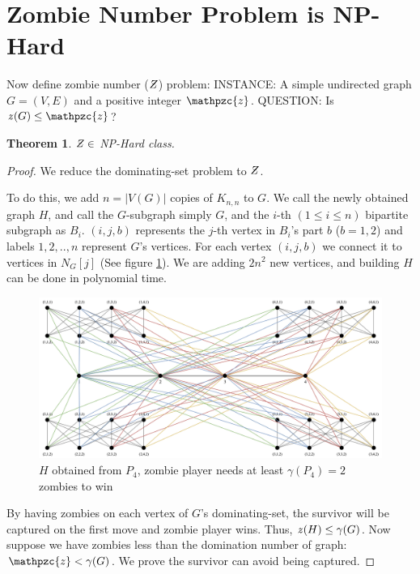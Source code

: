 \documentclass[1p]{elsarticle}
\newtheorem{theorem}{Theorem}
\newcommand{\NPZ}{\ooalign{$Z$\cr\hfil\rule[.8ex]{.3em}{.09ex}\hfil\cr}}
\newcommand{\zn}{\ooalign{$z$\cr\hfil\rule[.5ex]{.2em}{.08ex}\hfil\cr}}
\begin{document}
	\section{Zombie Number Problem is NP-Hard}\label{np-zombienumber}
	Now define zombie number ($\NPZ$) problem:
	{\newline}
	INSTANCE: A simple undirected graph $G = (V,E)$ and a positive integer $\mathpzc{z}$.
	{\newline}
	QUESTION: Is $\zn (G) \leq \mathpzc{z}$?

	\begin{theorem}
		$\NPZ \in$ NP-Hard class.
	\end{theorem}
	\begin{proof}
		We reduce the dominating-set problem to $\NPZ$.

		To do this, we add $n = |V(G)|$ copies of $K_{n,n}$ to $G$. We call the newly obtained graph $H$, and call the
		$G$-subgraph simply $G$, and the $i$-th $(1 \leq i \leq n)$ bipartite subgraph as $B_i$. $(i,j,b)$ represents
		the $j$-th vertex in $B_i$'s part $b$ ($b = 1,2$) and labels $1,2,..,n$ represent $G$'s vertices. For each
		vertex $(i,j,b)$ we connect it to vertices in $N_G[j]$ (See figure \ref{fig:p8}). We are adding $2n^2$ new
		vertices, and building $H$ can be done in polynomial time.

		\begin{figure}[h!]
			\centering
			\includegraphics[width=0.9\linewidth]{sec5.png}
			\caption{$H$ obtained from $P_4$, zombie player needs at least $\gamma(P_4) = 2$ zombies to win}
			\label{fig:p8}
		\end{figure}

		By having zombies on each vertex of $G$'s dominating-set, the survivor will be captured on the first move and zombie
		player wins. Thus, $\zn(H) \leq \gamma(G)$. Now suppose we have zombies less than the domination number of
		graph: $\mathpzc{z} < \gamma(G)$. We prove the survivor can avoid being captured.
		

\end{proof}
\end{document}
